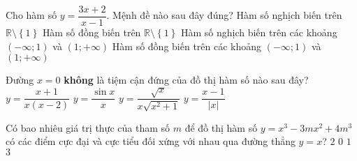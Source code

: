 \begin{ex} %
	Cho hàm số $y=\dfrac{3x+2}{x-1}$. Mệnh đề nào sau đây đúng?
	\choice
	{Hàm số nghịch biến trên $\mathbb{R} \setminus \left\{ 1\right\}$}
	{Hàm số đồng biến trên $\mathbb{R} \setminus \left\{ 1\right\}$}
	{\True Hàm số nghịch biến trên các khoảng $\left( -\infty;1 \right)$ và $\left(1;+\infty \right)$}
	{Hàm số đồng biến trên các khoảng $\left( -\infty;1 \right)$ và $\left(1;+\infty \right)$}
\end{ex}

\begin{ex} %
	Đường $x=0$ \textbf{không} là tiệm cận đứng của đồ thị hàm số nào sau đây?
	\choice
	{$y=\dfrac{x+1}{x(x-2)}$}
	{\True $y=\dfrac{\sin x}{x}$}
	{$y=\dfrac{\sqrt{x}}{x \sqrt{x^2 +1}}$}
	{$y=\dfrac{x-1}{\vert x \vert}$}
\end{ex}

\begin{ex} %
	Có bao nhiêu giá trị thực của tham số $m$ để đồ thị hàm số $y=x^3-3mx^2+4m^3$ có các điểm cực đại và cực tiểu đối xứng với nhau qua đường thẳng $y=x$?
	\choice
	{\True $2$}
	{$0$}
	{$1$}
	{$3$}
\end{ex}

